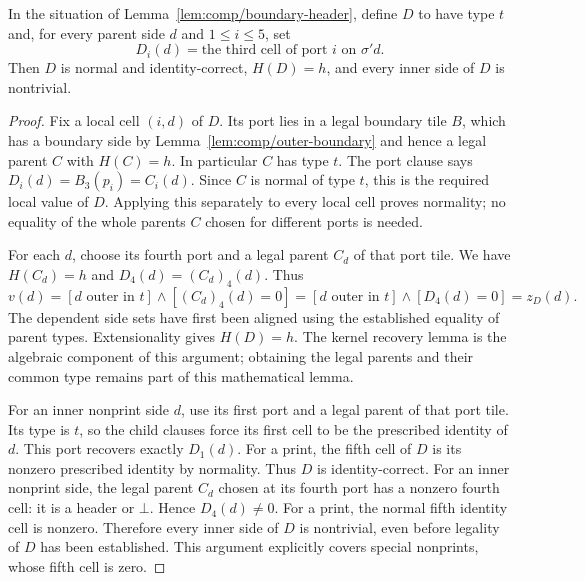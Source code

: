 \begin{lemma}
\label{lem:comp/reconstruction}
In the situation of Lemma~\ref{lem:comp/boundary-header}, define $D$ to have
type $t$ and, for every parent side $d$ and $1\le i\le5$, set
\[
 D_i(d)=\text{the third cell of port }i\text{ on }\sigma'd.
\]
Then $D$ is normal and identity-correct, $H(D)=h$, and every inner side of
$D$ is nontrivial.
\end{lemma}
\begin{proof}
Fix a local cell $(i,d)$ of $D$. Its port lies in a legal boundary tile $B$,
which has a boundary side by Lemma~\ref{lem:comp/outer-boundary} and hence
a legal parent $C$ with $H(C)=h$.
In particular $C$ has type $t$. The port clause says $D_i(d)=B_3(p_i)=C_i(d)$.
Since $C$ is normal of type $t$, this is the required local value of $D$.
Applying this separately to every local cell proves normality; no equality
of the whole parents $C$ chosen for different ports is needed.

For each $d$, choose its fourth port and a legal parent $C_d$ of that port
tile. We have $H(C_d)=h$ and $D_4(d)=(C_d)_4(d)$. Thus
\[
 v(d)=[d\text{ outer in }t]\wedge[(C_d)_4(d)=0]
     =[d\text{ outer in }t]\wedge[D_4(d)=0]=z_D(d).
\]
The dependent side sets have first been aligned using the established
equality of parent types. Extensionality gives $H(D)=h$. The kernel recovery
lemma is the algebraic component of this argument; obtaining the legal
parents and their common type remains part of this mathematical lemma.

For an inner nonprint side $d$, use its first port and a legal parent of
that port tile. Its type is $t$, so the child clauses force its first cell
to be the prescribed identity of $d$. This port recovers exactly $D_1(d)$.
For a print, the fifth cell of $D$ is its nonzero prescribed identity by
normality. Thus $D$ is identity-correct. For an inner nonprint side, the
legal parent $C_d$ chosen at its fourth port has a nonzero fourth cell: it
is a header or $\bot$. Hence $D_4(d)\ne0$. For a print, the normal fifth
identity cell is nonzero. Therefore every inner side of $D$ is nontrivial,
even before legality of $D$ has been established. This argument explicitly
covers special nonprints, whose fifth cell is zero.
\end{proof}

